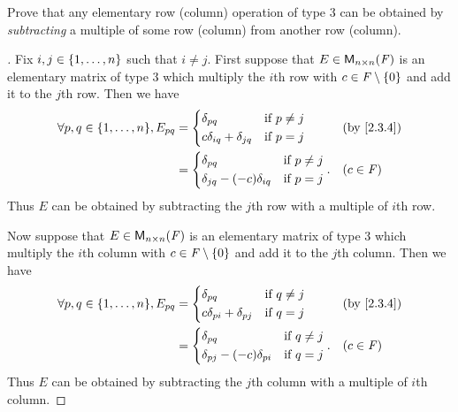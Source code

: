 \begin{ex}\label{ex:3.1.11}
	Prove that any elementary row (column) operation of type 3 can be obtained by \emph{subtracting} a multiple of some row (column) from another row (column).
\end{ex}

\begin{proof}[]
	Fix \(i, j \in \left\lbrace1, \dots, n\right\rbrace\) such that \(i \neq j\).
	First suppose that \(E \in \ms[n][n][\F]\) is an elementary matrix of type 3 which multiply the \(i\)th row with \(c \in \mathit{F} \setminus \left\lbrace0\right\rbrace\) and add it to the \(j\)th row.
	Then we have
	\begin{align*}
		\forall p, q \in \set{1, \dots, n}, E_{p q} & = \begin{dcases}
			                                                \delta_{p q}                  & \text{if } p \neq j \\
			                                                c \delta_{i q} + \delta_{j q} & \text{if } p = j
		                                                \end{dcases}    &  & \by{2.3.4}    \\
		                                            & = \begin{dcases}
			                                                \delta_{p q}                     & \text{if } p \neq j \\
			                                                \delta_{j q} - (-c) \delta_{i q} & \text{if } p = j
		                                                \end{dcases}. &  & (c \in \F)
	\end{align*}
	Thus \(E\) can be obtained by subtracting the \(j\)th row with a multiple of \(i\)th row.

	Now suppose that \(E \in \ms[n][n][\F]\) is an elementary matrix of type 3 which multiply the \(i\)th column with \(c \in \mathit{F} \setminus \left\lbrace0\right\rbrace\) and add it to the \(j\)th column.
	Then we have
	\begin{align*}
		\forall p, q \in \set{1, \dots, n}, E_{p q} & = \begin{dcases}
			                                                \delta_{p q}                  & \text{if } q \neq j \\
			                                                c \delta_{p i} + \delta_{p j} & \text{if } q = j
		                                                \end{dcases}    &  & \by{2.3.4}    \\
		                                            & = \begin{dcases}
			                                                \delta_{p q}                     & \text{if } q \neq j \\
			                                                \delta_{p j} - (-c) \delta_{p i} & \text{if } q = j
		                                                \end{dcases}. &  & (c \in \F)
	\end{align*}
	Thus \(E\) can be obtained by subtracting the \(j\)th column with a multiple of \(i\)th column.
\end{proof}

